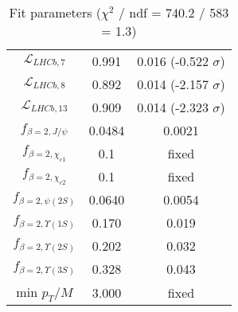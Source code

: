 \begin{table}[h!]
\begin{tabular}{c|c|c}
$\mathcal L_{LHCb,7}$ & 0.991 & 0.016 (-0.522 $\sigma$) \\
$\mathcal L_{LHCb,8}$ & 0.892 & 0.014 (-2.157 $\sigma$) \\
$\mathcal L_{LHCb,13}$ & 0.909 & 0.014 (-2.323 $\sigma$) \\
$f_{\beta=2,J/\psi}$ & 0.0484 & 0.0021 \\
$f_{\beta=2,\chi_{c1}}$ & 0.1 & fixed \\
$f_{\beta=2,\chi_{c2}}$ & 0.1 & fixed \\
$f_{\beta=2,\psi(2S)}$ & 0.0640 & 0.0054 \\
$f_{\beta=2,\Upsilon(1S)}$ & 0.170 & 0.019 \\
$f_{\beta=2,\Upsilon(2S)}$ & 0.202 & 0.032 \\
$f_{\beta=2,\Upsilon(3S)}$ & 0.328 & 0.043 \\
min $p_T/M$ & 3.000 & fixed \\
\end{tabular}
\caption{Fit parameters ($\chi^2$ / ndf = 740.2 / 583 = 1.3)}
\end{table}
